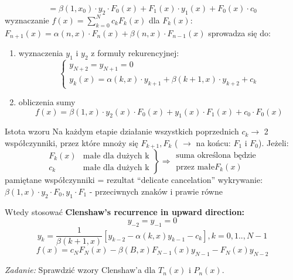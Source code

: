 \begin{frame}
	$$=\beta(1,x_0) \cdot y_2 \cdot F_0(x)+F_1(x) \cdot y_1(x) +F_0(x) \cdot c_0 $$
    wyznaczanie $f(x) = \sum_{k=0}^{N}c_kF_k(x)$ \newline
    dla $F_k(x)$: $F_{n+1}(x) = \alpha(n,x) \cdot F_n(x) + \beta(n,x) \cdot F_{n-1}(x)$ \newline
    sprowadza się do:
    \begin{enumerate}
    \item wyznaczenia $y_1$ i $y_2$ z formuły rekurencyjnej: \newline
    	$$\left\{\begin{array}{l}
    	y_{N+2} = y_{N+1} = 0 \\
        y_k(x) = \alpha(k,x) \cdot y_{k+1} + \beta(k+1,x) \cdot y_{k+2} +c_k
    	\end{array}\right.$$
     \item obliczenia sumy \newline
     $$f(x) = \beta(1,x) \cdot y_2(x) \cdot F_0(x) + y_1(x) \cdot F_1(x) + c_0 \cdot F_0(x)$$
    \end{enumerate}
\end{frame}
\begin{frame}{Istota wzoru}
	Na każdym etapie działanie wszystkich poprzednich $c_k \rightarrow$ 2 współczynniki, przez które mnoży się $F_{k+1},F_k$ ( $\rightarrow$ na końcu: $F_1$ i $F_0$).\newline
    Jeżeli:
    $$\left.\begin{array}{cl}
    	F_k(x) & \text{małe dla dużych k} \\
        c_k & \text{małe dla dużych k}
    \end{array}\right\} \Rightarrow\left.\begin{array}{c}
    	 \text{suma określona będzie} \\
         \text{przez małe} F_k(x)
    \end{array}\right.$$
    pamiętane współczynniki = rezultat ``delicate cancelation'' \newline
    wykrywanie: $\beta(1,x) \cdot y_2 \cdot F_0,y_1 \cdot F_1$ - przeciwnych znaków i prawie równe
\end{frame}
\begin{frame}
	Wtedy stosować \textbf{Clenshaw's recurrence in upward direction:}
    $$y_{-2} = y_{-1} = 0$$
    $$y_k = \frac{1}{\beta(k+1,x)}[y_{k-2}-\alpha(k,x)y_{k-1} - c_k], k=0,1..,N-1$$
    $$f(x) = c_NF_N(x) - \beta(B,x)F_{N-1}(x)y_{N-1} - F_N(x)y_{N-2}$$
    \begin{flushright}
    	\textit{Zadanie: } \quad Sprawdzić wzory Clenshaw'a dla $T_n(x)$ i $P_n(x)$.
    \end{flushright}
\end{frame}
